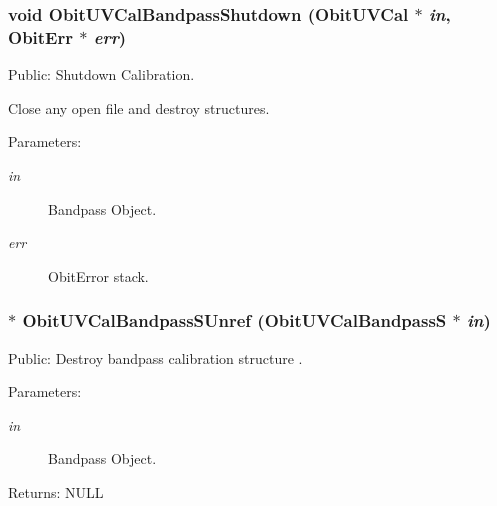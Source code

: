 \subsubsection{\setlength{\rightskip}{0pt plus 5cm}void Obit\-UVCal\-Bandpass\-Shutdown ({\bf Obit\-UVCal} $\ast$ {\em in}, {\bf Obit\-Err} $\ast$ {\em err})}\label{ObitUVCalBandpass_8c_a13}


Public: Shutdown Calibration. 

Close any open file and destroy structures. \begin{Desc}
\item[Parameters:]
\begin{description}
\item[{\em in}]Bandpass Object. \item[{\em err}]Obit\-Error stack. \end{description}
\end{Desc}
\subsubsection{$\ast$ Obit\-UVCal\-Bandpass\-SUnref ({\bf Obit\-UVCal\-Bandpass\-S} $\ast$ {\em in})}\label{ObitUVCalBandpass_8c_a14}


Public: Destroy bandpass calibration structure . 

\begin{Desc}
\item[Parameters:]
\begin{description}
\item[{\em in}]Bandpass Object. \end{description}
\end{Desc}
\begin{Desc}
\item[Returns:]NULL \end{Desc}
